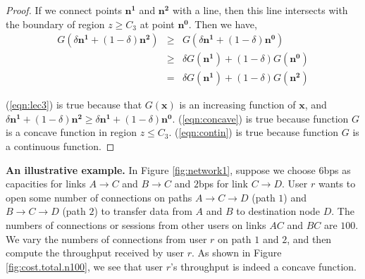 \documentclass[conference]{IEEEtran}
\begin{document}
\begin{proof}
If we connect points $\mathbf{n^1}$ and $\mathbf{n^2}$ with a
line, then this line intersects with the boundary of region $z \ge
C_3$ at point $\mathbf{n^0}$. Then we have,
\begin{eqnarray}
G(\delta \mathbf{n^1} + (1-\delta) \mathbf{n^2}) &\ge &
G(\delta \mathbf{n^1} + (1-\delta) \mathbf{n^0}) \label{eqn:lec3} \\
&\ge & \delta G(\mathbf{n^1})+ (1-\delta) G(\mathbf{n^0}) \label{eqn:concave}\\
&=& \delta G(\mathbf{n^1})+ (1-\delta) G(\mathbf{n^2})
\label{eqn:contin}
\end{eqnarray}

(\ref{eqn:lec3}) is true because that $G(\mathbf{x})$ is an
increasing function of $\mathbf{x}$, and $\delta \mathbf{n^1} +
(1-\delta) \mathbf{n^2} \ge \delta \mathbf{n^1} + (1-\delta)
\mathbf{n^0}$. (\ref{eqn:concave}) is true because function $G$ is
a concave function in region $z \le C_3$. (\ref{eqn:contin}) is
true because function $G$ is a continuous function.

\end{proof}



\bigskip
\noindent \textbf{An illustrative example.} In Figure
\ref{fig:network1}, suppose we choose $6$bps as capacities for
links $A\to C$ and $B\to C$ and $2$bps for link $C\to D$. User $r$
wants to open some number of connections on paths $A\to C\to D$
(path $1$) and $B\to C\to D$ (path $2$) to transfer data from $A$
and $B$ to destination node $D$.
The numbers of connections or sessions from other users on links
$AC$ and $BC$ are $100$. We vary the numbers of connections from
user $r$ on path $1$ and $2$, and then compute the throughput
received by user $r$.
As shown in Figure \ref{fig:cost.total.n100}, we see that user
$r$'s throughput is indeed a concave function.
\end{document}
